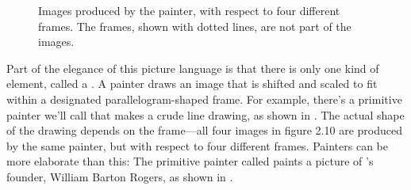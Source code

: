 \begin{figure}[tb]
	\centering
	
	\caption{
		Images produced by the  painter, with respect to four different frames.
		The frames, shown with dotted lines, are not part of the images.
	}
	\label{Figure 2.10}
\end{figure}

Part of the elegance of this picture language is that there is only one kind of element, called a .
A painter draws an image that is shifted and scaled to fit within a designated parallelogram-shaped frame.
For example, there’s a primitive painter we’ll call  that makes a crude line drawing, as shown in .
The actual shape of the drawing depends on the frame---all four images in figure 2.10 are produced by the same  painter, but with respect to four different frames.
Painters can be more elaborate than this:
The primitive painter called  paints a picture of ’s founder, William Barton Rogers, as shown in .%
